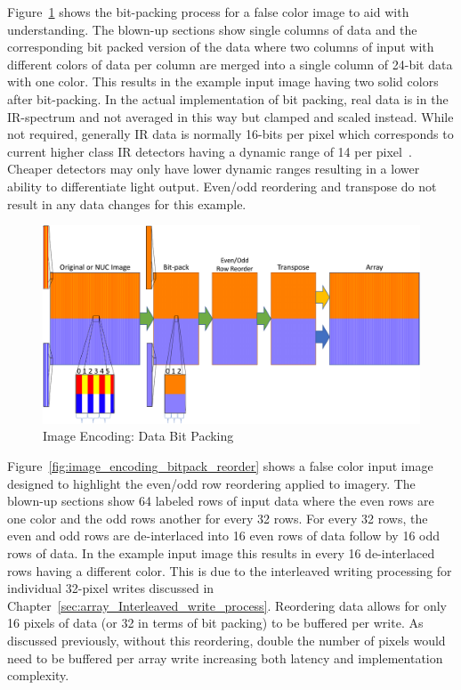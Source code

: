     Figure~\ref{fig:image_encoding_bitback} shows the bit-packing process for a false color image to aid with understanding. The blown-up sections show single columns of data and the corresponding bit packed version of the data where two columns of input with different colors of data per column are merged into a single column of 24-bit data with one color. This results in the example input image having two solid colors after bit-packing. In the actual implementation of bit packing, real data is in the IR-spectrum and not averaged in this way but clamped and scaled instead. While not required, generally IR data is normally 16-bits per pixel which corresponds to current higher class IR detectors having a dynamic range of 14 per pixel~\cite{FLIR2014_1, FLIR2014_2, FLIR2016}. Cheaper detectors may only have lower dynamic ranges resulting in a lower ability to differentiate light output. Even/odd reordering and transpose do not result in any data changes for this example.

    \begin{figure}
        \centering
        \includegraphics[width=1.0\textwidth]{fig/image_encoding_bitback.pdf}
        \caption{Image Encoding: Data Bit Packing}
        \label{fig:image_encoding_bitback}
    \end{figure}

    Figure~\ref{fig:image_encoding_bitpack_reorder} shows a false color input image designed to highlight the even/odd row reordering applied to imagery. The blown-up sections show 64 labeled rows of input data where the even rows are one color and the odd rows another for every 32 rows. For every 32 rows, the even and odd rows are de-interlaced into 16 even rows of data follow by 16 odd rows of data. In the example input image this results in every 16 de-interlaced rows having a different color. This is due to the interleaved writing processing for individual 32-pixel writes discussed in Chapter~\ref{sec:array_Interleaved_write_process}. Reordering data allows for only 16 pixels of data (or 32 in terms of bit packing) to be buffered per write. As discussed previously, without this reordering, double the number of pixels would need to be buffered per array write increasing both latency and implementation complexity.

